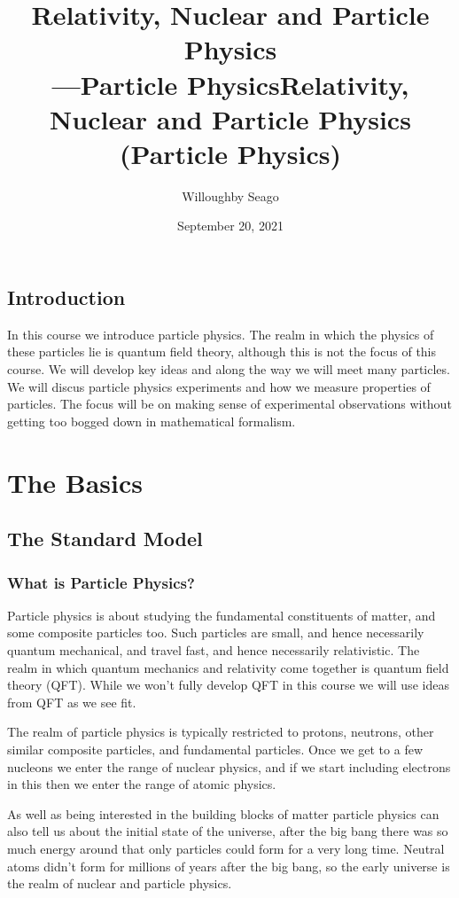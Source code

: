 \documentclass[fleqn]{NotesClass}
\title{Relativity, Nuclear and Particle Physics\\{\Huge---Particle Physics}}
\author{Willoughby Seago}
\date{September 20, 2021}
\begin{document}
    \frontmatter
    \titlepage
    \title{Relativity, Nuclear and Particle Physics (Particle Physics)}
    \tableofcontents
    \listoftables
    \mainmatter
    
    \chapter{Introduction}
    In this course we introduce particle physics.
    The realm in which the physics of these particles lie is quantum field theory, although this is not the focus of this course.
    We will develop key ideas and along the way we will meet many particles.
    We will discus particle physics experiments and how we measure properties of particles.
    The focus will be on making sense of experimental observations without getting too bogged down in mathematical formalism.
    
    \part{The Basics}
    \chapter{The Standard Model}
    \section{What is Particle Physics?}
    Particle physics is about studying the fundamental constituents of matter, and some composite particles too.
    Such particles are small, and hence necessarily quantum mechanical, and travel fast, and hence necessarily relativistic.
    The realm in which quantum mechanics and relativity come together is quantum field theory (QFT).
    While we won't fully develop QFT in this course we will use ideas from QFT as we see fit.
    
    The realm of particle physics is typically restricted to protons, neutrons, other similar composite particles, and fundamental particles.
    Once we get to a few nucleons we enter the range of nuclear physics, and if we start including electrons in this then we enter the range of atomic physics.
    
    As well as being interested in the building blocks of matter particle physics can also tell us about the initial state of the universe, after the big bang there was so much energy around that only particles could form for a very long time.
    Neutral atoms didn't form for millions of years after the big bang, so the early universe is the realm of nuclear and particle physics.
    
\end{document}
